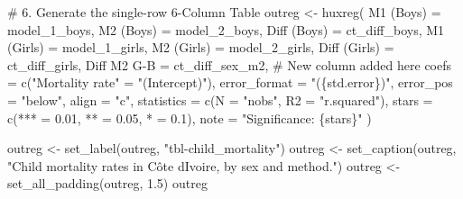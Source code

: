 \documentclass[
  letterpaper,
  DIV=11,
  numbers=noendperiod]{scrartcl}
\newenvironment{Shaded}{\begin{snugshade}}{\end{snugshade}}
\newcommand{\AttributeTok}[1]{\textcolor[rgb]{0.40,0.45,0.13}{#1}}
\newcommand{\CommentTok}[1]{\textcolor[rgb]{0.37,0.37,0.37}{#1}}
\newcommand{\FloatTok}[1]{\textcolor[rgb]{0.68,0.00,0.00}{#1}}
\newcommand{\FunctionTok}[1]{\textcolor[rgb]{0.28,0.35,0.67}{#1}}
\newcommand{\NormalTok}[1]{\textcolor[rgb]{0.00,0.23,0.31}{#1}}
\newcommand{\OtherTok}[1]{\textcolor[rgb]{0.00,0.23,0.31}{#1}}
\newcommand{\StringTok}[1]{\textcolor[rgb]{0.13,0.47,0.30}{#1}}
\begin{document}
\begin{Shaded}
\begin{Highlighting}[]
\CommentTok{\# 6. Generate the single{-}row 6{-}Column Table}
\NormalTok{outreg }\OtherTok{\textless{}{-}} \FunctionTok{huxreg}\NormalTok{(}
  \StringTok{\textasciigrave{}}\AttributeTok{M1 (Boys)}\StringTok{\textasciigrave{}} \OtherTok{=}\NormalTok{ model\_1\_boys,}
  \StringTok{\textasciigrave{}}\AttributeTok{M2 (Boys)}\StringTok{\textasciigrave{}} \OtherTok{=}\NormalTok{ model\_2\_boys,}
  \StringTok{\textasciigrave{}}\AttributeTok{Diff (Boys)}\StringTok{\textasciigrave{}} \OtherTok{=}\NormalTok{ ct\_diff\_boys,}
  \StringTok{\textasciigrave{}}\AttributeTok{M1 (Girls)}\StringTok{\textasciigrave{}} \OtherTok{=}\NormalTok{ model\_1\_girls,}
  \StringTok{\textasciigrave{}}\AttributeTok{M2 (Girls)}\StringTok{\textasciigrave{}} \OtherTok{=}\NormalTok{ model\_2\_girls,}
  \StringTok{\textasciigrave{}}\AttributeTok{Diff (Girls)}\StringTok{\textasciigrave{}} \OtherTok{=}\NormalTok{ ct\_diff\_girls,}
  \StringTok{\textasciigrave{}}\AttributeTok{Diff M2 G{-}B}\StringTok{\textasciigrave{}} \OtherTok{=}\NormalTok{ ct\_diff\_sex\_m2, }\CommentTok{\# New column added here}
  \AttributeTok{coefs =} \FunctionTok{c}\NormalTok{(}\StringTok{"Mortality rate"} \OtherTok{=} \StringTok{"(Intercept)"}\NormalTok{),}
  \AttributeTok{error\_format =} \StringTok{"(\{std.error\})"}\NormalTok{,}
  \AttributeTok{error\_pos =} \StringTok{"below"}\NormalTok{,}
  \AttributeTok{align =} \StringTok{"c"}\NormalTok{,}
  \AttributeTok{statistics =} \FunctionTok{c}\NormalTok{(}\AttributeTok{N =} \StringTok{"nobs"}\NormalTok{, }\AttributeTok{R2 =} \StringTok{"r.squared"}\NormalTok{),}
  \AttributeTok{stars =} \FunctionTok{c}\NormalTok{(}\StringTok{\textasciigrave{}}\AttributeTok{***}\StringTok{\textasciigrave{}} \OtherTok{=} \FloatTok{0.01}\NormalTok{, }\StringTok{\textasciigrave{}}\AttributeTok{**}\StringTok{\textasciigrave{}} \OtherTok{=} \FloatTok{0.05}\NormalTok{, }\StringTok{\textasciigrave{}}\AttributeTok{*}\StringTok{\textasciigrave{}} \OtherTok{=} \FloatTok{0.1}\NormalTok{),}
  \AttributeTok{note =} \StringTok{"Significance: \{stars\}"}
\NormalTok{)}

\NormalTok{outreg }\OtherTok{\textless{}{-}} \FunctionTok{set\_label}\NormalTok{(outreg, }\StringTok{"tbl{-}child\_mortality"}\NormalTok{)}
\NormalTok{outreg }\OtherTok{\textless{}{-}} \FunctionTok{set\_caption}\NormalTok{(outreg, }\StringTok{"Child mortality rates in Côte d\textquotesingle{}Ivoire, by sex and method."}\NormalTok{)}
\NormalTok{outreg }\OtherTok{\textless{}{-}} \FunctionTok{set\_all\_padding}\NormalTok{(outreg, }\FloatTok{1.5}\NormalTok{)}
\NormalTok{outreg}
\end{Highlighting}
\end{Shaded}
\end{document}

